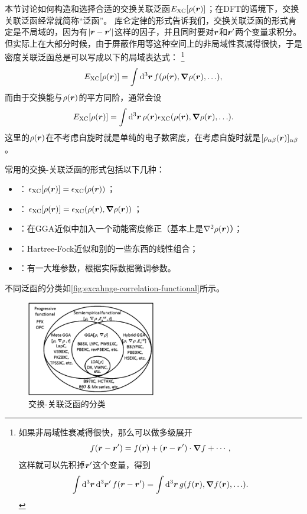 本节讨论如何构造和选择合适的交换关联泛函$E_\text{XC}[\rho(\vb*{r})]$；在DFT的语境下，交换关联泛函经常就简称“泛函”。
库仑定律的形式告诉我们，交换关联泛函的形式肯定是不局域的，因为有$\abs{\vb*{r} - \vb*{r}'}$这样的因子，并且同时要对$\vb*{r}$和$\vb*{r}'$两个变量求积分。
但实际上在大部分时候，由于屏蔽作用等这种空间上的非局域性衰减得很快，于是密度关联泛函总是可以写成以下的局域表达式：%
\footnote{
    如果非局域性衰减得很快，那么可以做多级展开
    \[
        f(\vb*{r} - \vb*{r}') = f(\vb*{r}) + (\vb*{r} - \vb*{r}') \cdot \grad{f} + \cdots,
    \]
    这样就可以先积掉$\vb*{r}'$这个变量，得到
    \[
        \int \dd[3]{\vb*{r}} \dd[3]{\vb*{r}'} f(\vb*{r} - \vb*{r}') = \int \dd[3]{\vb*{r}} g(f(\vb*{r}), \grad{f(\vb*{r})}, \ldots).
    \]
}%
\[
    E_\text{XC}[\rho(\vb*{r})] = \int \dd[3]{\vb*{r}} f(\rho(\vb*{r}), \grad{\rho(\vb*{r})}, \ldots),
\]
而由于交换能与$\rho(\vb*{r})$的平方同阶，通常会设
\begin{equation}
    E_\text{XC}[\rho(\vb*{r})] = \int \dd[3]{\vb*{r}} \rho(\vb*{r}) \epsilon_\text{XC}(\rho(\vb*{r}), \grad{\rho(\vb*{r})}, \ldots).
\end{equation}
这里的$\rho(\vb*{r})$在不考虑自旋时就是单纯的电子数密度，在考虑自旋时就是$[\rho_{\alpha \beta}(\vb*{r})]_{\alpha \beta}$。

常用的交换-关联泛函的形式包括以下几种：
\begin{itemize}
    \item {}：$\epsilon_\text{XC}[\rho(\vb*{r})] = \epsilon_\text{XC}(\rho(\vb*{r}))$；
    \item {}：$\epsilon_\text{XC}[\rho(\vb*{r})] = \epsilon_\text{XC}(\rho(\vb*{r}), \grad{\rho(\vb*{r})})$；
    \item {}：在GGA近似中加入一个动能密度修正（基本上是$\laplacian \rho(\vb*{r})$）；
    \item {}：Hartree-Fock近似和别的一些东西的线性组合；
    \item {}：有一大堆参数，根据实际数据微调参数。
\end{itemize}
不同泛函的分类如\autoref{fig:excahnge-correlation-functional}所示。

\begin{figure}
    \centering
    \includegraphics[width=0.5\textwidth]{functional-classification.png}
    \caption{交换-关联泛函的分类}
    \label{fig:excahnge-correlation-functional}
\end{figure}

